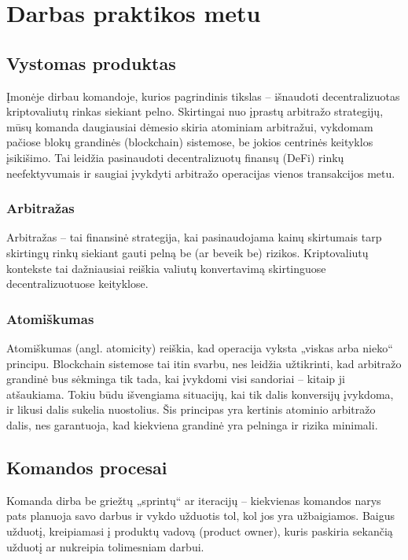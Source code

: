 \documentclass[]{VUMIFTemplateClass}
\begin{document}
\section{Darbas praktikos metu}

\subsection{Vystomas produktas}

Įmonėje dirbau komandoje, kurios pagrindinis tikslas – išnaudoti decentralizuotas kriptovaliutų rinkas siekiant pelno. Skirtingai nuo įprastų arbitražo strategijų, mūsų komanda daugiausiai dėmesio skiria atominiam arbitražui, vykdomam pačiose blokų grandinės (blockchain) sistemose, be jokios centrinės keityklos įsikišimo. Tai leidžia pasinaudoti decentralizuotų finansų (DeFi) rinkų neefektyvumais ir saugiai įvykdyti arbitražo operacijas vienos transakcijos metu.

\subsubsection{Arbitražas}

Arbitražas – tai finansinė strategija, kai pasinaudojama kainų skirtumais tarp skirtingų rinkų siekiant gauti pelną be (ar beveik be) rizikos. Kriptovaliutų kontekste tai dažniausiai reiškia valiutų konvertavimą skirtinguose decentralizuotuose keityklose.

\subsubsection{Atomiškumas}

Atomiškumas (angl. atomicity) reiškia, kad operacija vyksta „viskas arba nieko“ principu. Blockchain sistemose tai itin svarbu, nes leidžia užtikrinti, kad arbitražo grandinė bus sėkminga tik tada, kai įvykdomi visi sandoriai – kitaip ji atšaukiama. Tokiu būdu išvengiama situacijų, kai tik dalis konversijų įvykdoma, ir likusi dalis sukelia nuostolius. Šis principas yra kertinis atominio arbitražo dalis, nes garantuoja, kad kiekviena grandinė yra pelninga ir rizika minimali.

\subsection{Komandos procesai}

Komanda dirba be griežtų „sprintų“ ar iteracijų – kiekvienas komandos narys pats planuoja savo darbus ir vykdo užduotis tol, kol jos yra užbaigiamos. Baigus užduotį, kreipiamasi į produktų vadovą (product owner), kuris paskiria sekančią užduotį ar nukreipia tolimesniam darbui.
\end{document}
